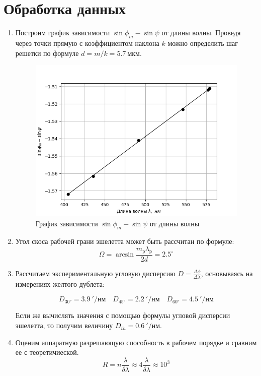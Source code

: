 \documentclass[14pt, a4paper]{report}
\begin{document}
\section{Обработка данных}

\begin{enumerate}

\item Построим график зависимости $\sin\phi_m-\sin\psi$ от длины волны. Проведя через точки прямую с коэффициентом наклона $k$ можно определить шаг решетки по формуле $d=m/k=5.7\ мкм$.

\begin{figure}[H]
\centering
\includegraphics[scale=0.6]{../images/442_1.png}
\caption{График зависимости $\sin\phi_m-\sin\psi$ от длины волны}
\end{figure}

\item Угол скоса рабочей грани эшелетта может быть рассчитан по формуле:
\[\Omega=\arcsin\frac{m_р\lambda_р}{2d}=2.5^\circ\]

\item Рассчитаем экспериментальную угловую дисперсию $D=\frac{\Delta\phi}{\Delta\lambda}$, основываясь на измерениях желтого дублета:

\[D_{\ang{30}}=3.9\ '/нм\quad D_{\ang{45}}=2.2\ '/нм\quad D_{\ang{60}}=4.5\ '/нм\]

Если же вычислять значения с помощью формулы угловой дисперсии эшелетта, то получим величину $D_{th}=0.6\ '/нм$.

\item Оценим аппаратную разрешающую способность в рабочем порядке и сравним ее с теоретичиеской.
\[R=n\frac{\lambda}{\delta\lambda}\approx4\frac{\lambda}{\delta\lambda}\approx10^3\]


\end{enumerate}
\end{document}
